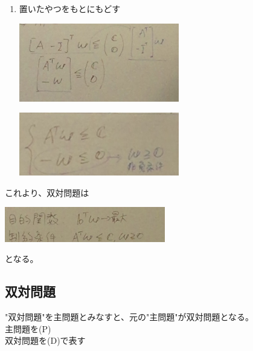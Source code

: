 \documentclass{jsarticle}
\begin{document}
{{{\begin{enumerate}
\begin{center}
				\end{center}	
				\item 置いたやつをもとにもどす\\
				\begin{center}
					\includegraphics[width=7cm]{1_21_7.JPG}
				\end{center}	
				\begin{center}
					\includegraphics[width=7cm]{1_21_8.JPG}
				\end{center}	
		\end{enumerate}
		これより、双対問題は
		\begin{center}
			\includegraphics[width=7cm]{1_21_9.JPG}
		\end{center}	
		となる。
		\subsection{双対問題}
			"双対問題"を主問題とみなすと、元の"主問題"が双対問題となる。\\
			主問題を(P)\\
			双対問題を(D)で表す\\
}}}
\end{document}
